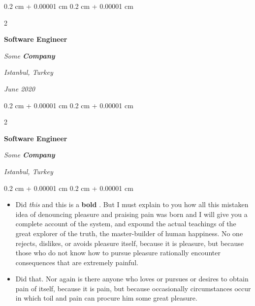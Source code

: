 \documentclass[10pt, letterpaper]{article}
\newenvironment{highlights}{
    \begin{itemize}[
        topsep=0.10 cm,
        parsep=0.10 cm,
        partopsep=0pt,
        itemsep=0pt,
        leftmargin=0.4 cm + 10pt
    ]
}{
    \end{itemize}
} %
\newenvironment{onecolentry}{
    \begin{adjustwidth}{
        0.2 cm + 0.00001 cm
    }{
        0.2 cm + 0.00001 cm
    }
}{
    \end{adjustwidth}
} %
\newenvironment{twocolentry}[2][]{
    \onecolentry
    \def\secondColumn{#2}
    \setcolumnwidth{\fill, 4.5 cm}
    \begin{paracol}{2}
}{
    \switchcolumn \raggedleft \secondColumn
    \end{paracol}
    \endonecolentry
} %
\let\hrefWithoutArrow\href
\renewcommand{\href}[2]{\hrefWithoutArrow{#1}{\ifthenelse{\equal{#2}{}}{ }{#2 }\raisebox{.15ex}{\footnotesize \faExternalLink*}}}
\begin{document}
        \vspace{0.2 cm}

            \begin{twocolentry}{
        \textit{Istanbul, Turkey}

        \textit{June 2020}    }
                \textbf{Software Engineer}

                \textit{Some \textbf{Company}}
            \end{twocolentry}



        \vspace{0.2 cm}

            \begin{twocolentry}{
        \textit{Istanbul, Turkey}

            }
                \textbf{Software Engineer}

                \textit{Some \textbf{Company}}
            \end{twocolentry}

        \vspace{0.10 cm}
        \begin{onecolentry}
            \begin{highlights}
                \item Did \textit{this} and this is a \textbf{bold} \href{https://example.com}{link}. But I must explain to you how all this mistaken idea of denouncing pleasure and praising pain was born and I will give you a complete account of the system, and expound the actual teachings of the great explorer of the truth, the master-builder of human happiness. No one rejects, dislikes, or avoids pleasure itself, because it is pleasure, but because those who do not know how to pursue pleasure rationally encounter consequences that are extremely painful.
                \item Did that. Nor again is there anyone who loves or pursues or desires to obtain pain of itself, because it is pain, but because occasionally circumstances occur in which toil and pain can procure him some great pleasure.
            \end{highlights}
        \end{onecolentry}
\end{document}
